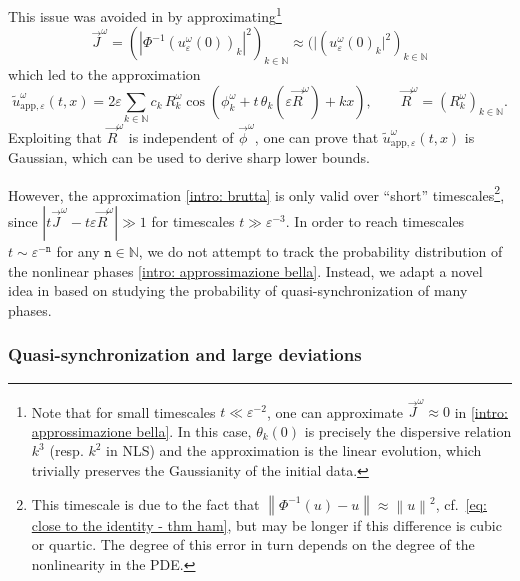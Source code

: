 \documentclass[a4paper,10pt,reqno]{article}
\theoremstyle{definition}
\theoremstyle{plain}
\theoremstyle{plain}
\theoremstyle{definition}
\theoremstyle{plain}
\theoremstyle{plain}
\theoremstyle{plain}
\theoremstyle{definition}
\theoremstyle{definition}
\newcommand{\norm}[1]{\left\lVert #1 \right\rVert}
\def \N{\mathbb N}
\def \tn{\mathtt{n}}
\begin{document}
This issue was avoided in \cite{grande} by approximating\footnote{Note that for small timescales $t\ll \varepsilon^{-2}$, one can approximate $\vec{J}^{\omega}\approx 0$ in \eqref{intro: approssimazione bella}. In this case, $\theta_k(0)$ is precisely the dispersive relation $k^3$ (resp. $k^2$ in NLS) and the approximation is the linear evolution, which trivially preserves the Gaussianity of the initial data.
} 
\begin{equation}\label{intro:phase_trick}
\vec{J}^{\omega} = ( |\Phi^{-1} (u_{\varepsilon}^{\omega}(0))_k|^2 )_{k\in\N} \approx ( |(u_{\varepsilon}^{\omega}(0)_k|^2 )_{k\in\N}
\end{equation}
which led to the approximation 
\begin{equation} \label{intro: brutta}
\widetilde{u}_{\mathrm{app},\varepsilon}^{\omega}(t,x) = 2 \varepsilon \sum_{k \in \N} c_k \, R_k^{\omega} \cos \left ( \phi_k^{\omega} + t \,\theta_k( \varepsilon\vec{R}^{\omega}) + kx \right ), \qquad \vec{R}^{\omega} = ( R_k^{\omega})_{k\in\N}.
\end{equation}
Exploiting that $\vec{R}^{\omega}$ is independent of $\vec{\phi}^{\omega}$, one can prove that $\widetilde{u}_{\mathrm{app},\varepsilon}^{\omega}(t,x)$ is Gaussian, which can be used to derive sharp lower bounds.  

\smallskip

However, the approximation \eqref{intro: brutta} is only valid over ``short'' timescales\footnote{
This timescale is due to the fact that $\norm{\Phi^{-1}(u)-u} \approx \norm{u}^2$, cf.~\eqref{eq: close to the identity - thm ham}, but may be longer 
if this difference is cubic or quartic. The degree of this error in turn depends on the degree of the nonlinearity in the PDE.
}, 
since $|t \vec{J}^{\omega} - t \varepsilon\vec{R}^{\omega}| \gg 1$ for timescales 
$t\gg \varepsilon^{-3}$. 
In order to reach timescales $t \sim \varepsilon^{-\tn}$ for any $\tn\in\N$, we do not attempt to track the probability distribution of the nonlinear phases \eqref{intro: approssimazione bella}. Instead, we adapt a novel idea in \cite{bertimasperograndestaffilani} based on studying the probability of quasi-synchronization of many phases.

\subsubsection{Quasi-synchronization and large deviations} 
\end{document}
